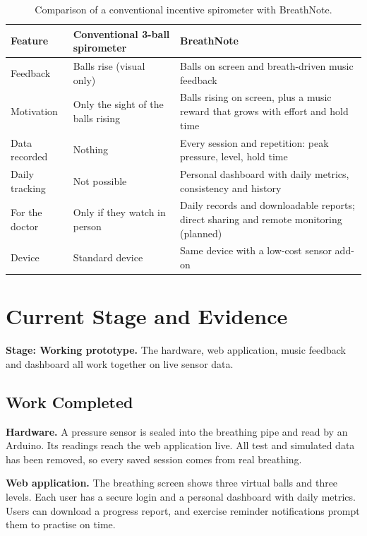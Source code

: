 \documentclass[12pt,a4paper]{article}
\begin{document}
\begin{table}[h]
\centering
\caption{Comparison of a conventional incentive spirometer with BreathNote.}
\label{tab:compare}
\small
\begin{tabularx}{\linewidth}{@{}P{3.1cm} L L@{}}
\toprule
\textbf{Feature} & \textbf{Conventional 3-ball spirometer} & \textbf{BreathNote} \\
\midrule
Feedback          & Balls rise (visual only)     & Balls on screen and breath-driven music feedback \\
Motivation        & Only the sight of the balls rising & Balls rising on screen, plus a music reward that grows with effort and hold time \\
Data recorded     & Nothing                      & Every session and repetition: peak pressure, level, hold time \\
Daily tracking    & Not possible                 & Personal dashboard with daily metrics, consistency and history \\
For the doctor    & Only if they watch in person & Daily records and downloadable reports; direct sharing and remote monitoring (planned) \\
Device            & Standard device              & Same device with a low-cost sensor add-on \\
\bottomrule
\end{tabularx}
\end{table}

\section{Current Stage and Evidence}

\textbf{Stage: Working prototype.} The hardware, web application, music feedback and dashboard all work together on live sensor data.

\subsection{Work Completed}

\textbf{Hardware.} A pressure sensor is sealed into the breathing pipe and read by an Arduino. Its readings reach the web application live. All test and simulated data has been removed, so every saved session comes from real breathing.

\textbf{Web application.} The breathing screen shows three virtual balls and three levels. Each user has a secure login and a personal dashboard with daily metrics. Users can download a progress report, and exercise reminder notifications prompt them to practise on time.
\end{document}
